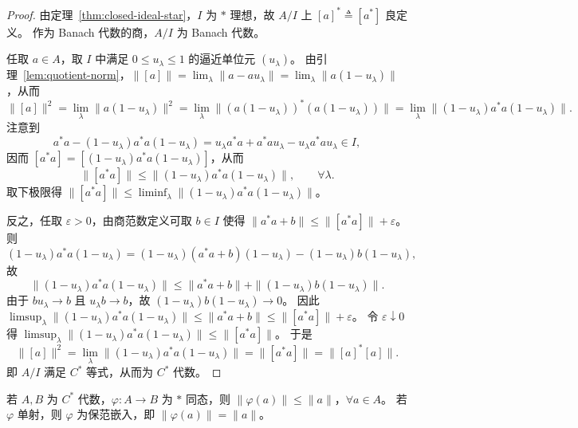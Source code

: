 \documentclass[lang=cn,a4paper,newtx,section]{elegantbook}
\begin{document}
  \begin{proof}
    由定理~\ref{thm:closed-ideal-star}，$I$ 为 $*$ 理想，故 $A/I$ 上 $[a]^*\triangleq [a^*]$ 良定义。
    作为 Banach 代数的商，$A/I$ 为 Banach 代数。

    任取 $a\in A$，取 $I$ 中满足 $0\le u_\lambda\le 1$ 的逼近单位元 $(u_\lambda)$。
    由引理~\ref{lem:quotient-norm}，$\|[a]\|=\lim_{\lambda}\|a-au_\lambda\|=\lim_{\lambda}\|a(1-u_\lambda)\|$，从而
    \begin{equation*}
      \|[a]\|^2=\lim_{\lambda}\|a(1-u_\lambda)\|^2=\lim_{\lambda}\|(a(1-u_\lambda))^*(a(1-u_\lambda))\|=\lim_{\lambda}\|(1-u_\lambda)a^*a(1-u_\lambda)\|.
    \end{equation*}
    注意到
    \begin{equation*}
      a^*a-(1-u_\lambda)a^*a(1-u_\lambda)=u_\lambda a^*a+a^*a u_\lambda-u_\lambda a^*a u_\lambda\in I,
    \end{equation*}
    因而 $[a^*a]=[(1-u_\lambda)a^*a(1-u_\lambda)]$，从而
    \begin{equation*}
      \|[a^*a]\|\le \|(1-u_\lambda)a^*a(1-u_\lambda)\|,\qquad \forall\lambda.
    \end{equation*}
    取下极限得 $\|[a^*a]\|\le \liminf_{\lambda}\|(1-u_\lambda)a^*a(1-u_\lambda)\|$。

    反之，任取 $\varepsilon>0$，由商范数定义可取 $b\in I$ 使得 $\|a^*a+b\|\le \|[a^*a]\|+\varepsilon$。
    则
    \begin{equation*}
      (1-u_\lambda)a^*a(1-u_\lambda)=(1-u_\lambda)(a^*a+b)(1-u_\lambda)-(1-u_\lambda)b(1-u_\lambda),
    \end{equation*}
    故
    \begin{equation*}
      \|(1-u_\lambda)a^*a(1-u_\lambda)\|\le \|a^*a+b\|+\|(1-u_\lambda)b(1-u_\lambda)\|.
    \end{equation*}
    由于 $bu_\lambda\to b$ 且 $u_\lambda b\to b$，故 $(1-u_\lambda)b(1-u_\lambda)\to 0$。
    因此 $\limsup_{\lambda}\|(1-u_\lambda)a^*a(1-u_\lambda)\|\le \|a^*a+b\|\le \|[a^*a]\|+\varepsilon$。
    令 $\varepsilon\downarrow 0$ 得 $\limsup_{\lambda}\|(1-u_\lambda)a^*a(1-u_\lambda)\|\le \|[a^*a]\|$。
    于是
    \begin{equation*}
      \|[a]\|^2=\lim_{\lambda}\|(1-u_\lambda)a^*a(1-u_\lambda)\|=\|[a^*a]\|=\|[a]^*[a]\|.
    \end{equation*}
    即 $A/I$ 满足 $C^*$ 等式，从而为 $C^*$ 代数。
  \end{proof}

  \begin{proposition}\label{prop:star-hom-norm}
    若 $A,B$ 为 $C^*$ 代数，$\varphi:A\to B$ 为 $*$ 同态，则 $\|\varphi(a)\|\le \|a\|$，$\forall a\in A$。
    若 $\varphi$ 单射，则 $\varphi$ 为保范嵌入，即 $\|\varphi(a)\|=\|a\|$。
  \end{proposition}
\end{document}
